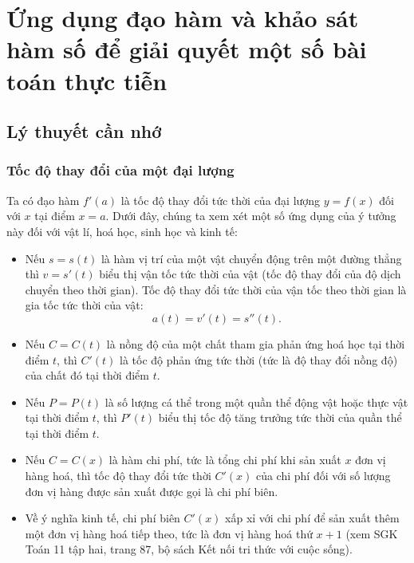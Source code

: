\setcounter{dang}{0}
\def\tenchude{ỨNG DỤNG THỰC TẾ}
\section{Ứng dụng đạo hàm và khảo sát hàm số để giải quyết một số bài toán thực tiễn}
\subsection{Lý thuyết cần nhớ}
\subsubsection{Tốc độ thay đổi của một đại lượng}
Ta có đạo hàm $f'(a)$ là tốc độ thay đổi tức thời của đại lượng $y=f(x)$ đối với $x$ tại điểm $x=a$. Dưới đây, chúng ta xem xét một số ứng dụng của ý tưởng này đối với vật lí, hoá học, sinh học và kinh tế: 
\begin{itemize}
	\item Nếu $s=s(t)$ là hàm vị trí của một vật chuyển động trên một đường thẳng thì $v=s'(t)$ biểu thị vận tốc tức thời của vật (tốc độ thay đổi của độ dịch chuyển theo thời gian). Tốc độ thay đổi tức thời của vận tốc theo thời gian là gia tốc tức thời của vật:
	$$
	a(t)=v'(t)=s''(t).
	$$
	\item Nếu $C=C(t)$ là nồng độ của một chất tham gia phản ứng hoá học tại thời điểm $t$, thì $C'(t)$ là tốc độ phản ứng tức thời (tức là độ thay đổi nồng độ) của chất đó tại thời điểm $t$.
	\item Nếu $P=P(t)$ là số lượng cá thể trong một quần thể động vật hoặc thực vật tại thời điểm $t$, thì $P'(t)$ biểu thị tốc độ tăng trưởng tức thời của quần thể tại thời điểm $t$.
	\item  Nếu $C=C(x)$ là hàm chi phí, tức là tổng chi phí khi sản xuất $x$ đơn vị hàng hoá, thì tốc độ thay đổi tức thời $C'(x)$ của chi phí đối với số lượng đơn vị hàng được sản xuất được gọi là chi phí biên.
	\item Về ý nghĩa kinh tế, chi phí biên $C'(x)$ xấp xỉ với chi phí để sản xuất thêm một đơn vị hàng hoá tiếp theo, tức là đơn vị hàng hoá thứ $x+1$ (xem SGK Toán 11 tập hai, trang 87, bộ sách Kết nối tri thức với cuộc sống). 
\end{itemize}
